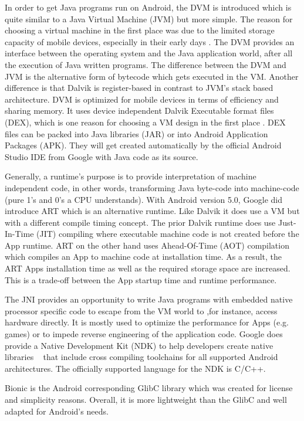 In order to get Java programs run on Android, the DVM is introduced
which is quite similar to a Java Virtual Machine (JVM) but more simple.
The reason for choosing a virtual machine in the first place was due
to the limited storage capacity of mobile devices, especially in their early days \parencite[p.11f]{levin}.
The DVM provides an interface between the operating system and
the Java application world, after all the execution of Java written programs.
The difference between the DVM and JVM is the alternative form of bytecode
which gets executed in the VM. Another difference is that Dalvik is
register-based in contrast to JVM's stack based architecture.
DVM is optimized for mobile devices
in terms of efficiency and sharing memory.
It uses device independent Dalvik Executable format files (DEX), which is one reason for choosing a VM design in the first place \parencite[p.11f]{levin}.
DEX files can be packed into Java libraries (JAR) or into Android Application Packages (APK). They will get created automatically by the official Android Studio IDE from Google with Java code as its source.

Generally, a runtime's purpose is to provide
interpretation of machine independent code, in other words,
transforming Java byte-code into machine-code (pure 1's and 0's a CPU understands).
With Android version 5.0, Google did introduce ART which is an
alternative runtime. Like Dalvik it does use a VM but with a
different compile timing concept.
The prior Dalvik runtime does use Just-In-Time (JIT) compiling
where executable machine code is not created before the App runtime.
ART on the other hand uses Ahead-Of-Time (AOT) compilation
which compiles an App to machine code at installation time.
As a result, the ART Apps installation time
as well as the required storage space are increased.
This is a trade-off between the App startup time and runtime performance.

The JNI provides an opportunity to write Java programs with embedded
native processor specific code to escape from the VM world to ,for
instance, access hardware directly.
It is mostly used to optimize the performance for Apps (e.g. games)
or to impede reverse engineering of the application code.
Google does provide a Native Development Kit (NDK) to help
developers create native libraries ~\parencite{ndk} that include
cross compiling toolchains for all supported Android architectures.
The officially supported language for the NDK is C/C++.

Bionic is the Android corresponding GlibC library which was created
for license and simplicity reasons. Overall, it is more lightweight
than the GlibC and well adapted for Android's needs.

